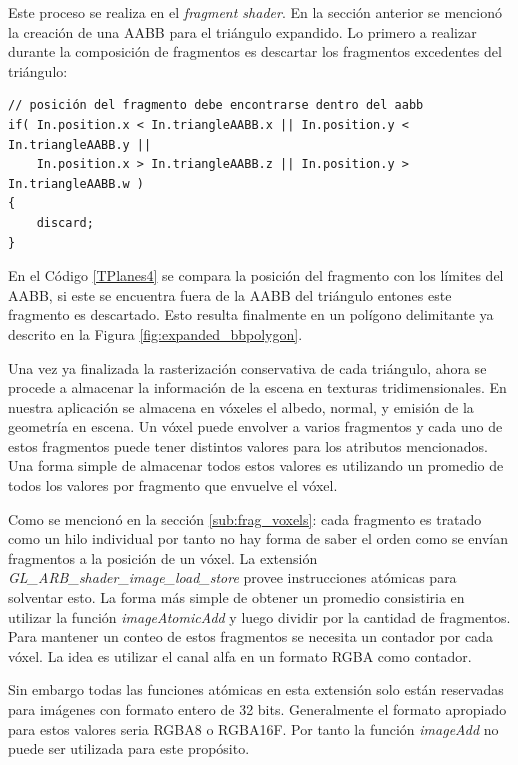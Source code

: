 Este proceso se realiza en el \emph{fragment shader}. En la sección anterior se mencionó la creación de una \ac{AABB} para el triángulo expandido. Lo primero a realizar durante la composición de fragmentos es descartar los fragmentos excedentes del triángulo:
\\
\begin{lstlisting}[caption={Descarte de fragmentos excedentes en el \emph{fragment shader}.}, label=TPlanes4]
// posición del fragmento debe encontrarse dentro del aabb
if( In.position.x < In.triangleAABB.x || In.position.y < In.triangleAABB.y || 
	In.position.x > In.triangleAABB.z || In.position.y > In.triangleAABB.w )
{
	discard;
}
\end{lstlisting}

En el Código \ref{TPlanes4} se compara la posición del fragmento con los límites del \ac{AABB}, si este se encuentra fuera de la \ac{AABB} del triángulo entones este fragmento es descartado. Esto resulta finalmente en un polígono delimitante ya descrito en la Figura \ref{fig:expanded_bbpolygon}.

Una vez ya finalizada la rasterización conservativa de cada triángulo, ahora se procede a almacenar la información de la escena en texturas tridimensionales. En nuestra aplicación se almacena en vóxeles el albedo, normal, y emisión de la geometría en escena. Un vóxel puede envolver a varios fragmentos y cada uno de estos fragmentos puede tener distintos valores para los atributos mencionados. Una forma simple de almacenar todos estos valores es utilizando un promedio de todos los valores por fragmento que envuelve el vóxel. 

Como se mencionó en la sección \ref{sub:frag_voxels}: cada fragmento es tratado como un hilo individual por tanto no hay forma de saber el orden como se envían fragmentos a la posición de un vóxel. La extensión \emph{GL\_ARB\_shader\_image\_load\_store} provee instrucciones atómicas para solventar esto. La forma más simple de obtener un promedio consistiria en utilizar la función \emph{imageAtomicAdd} y luego dividir por la cantidad de fragmentos. Para mantener un conteo de estos fragmentos se necesita un contador por cada vóxel. La idea es utilizar el canal alfa en un formato RGBA como contador. 

Sin embargo todas las funciones atómicas en esta extensión solo están reservadas para imágenes con formato entero de 32 bits. Generalmente el formato apropiado para estos valores seria RGBA8 o RGBA16F. Por tanto la función \emph{imageAdd} no puede ser utilizada para este propósito.

